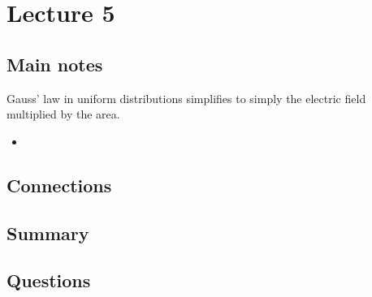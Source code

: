 \section{Lecture 5}
\subsection{Main notes}
Gauss' law in uniform distributions simplifies to simply the electric field multiplied by the area.


\begin{itemize}
	\item
\end{itemize}


\subsection{Connections}


\subsection{Summary}


\subsection{Questions}
